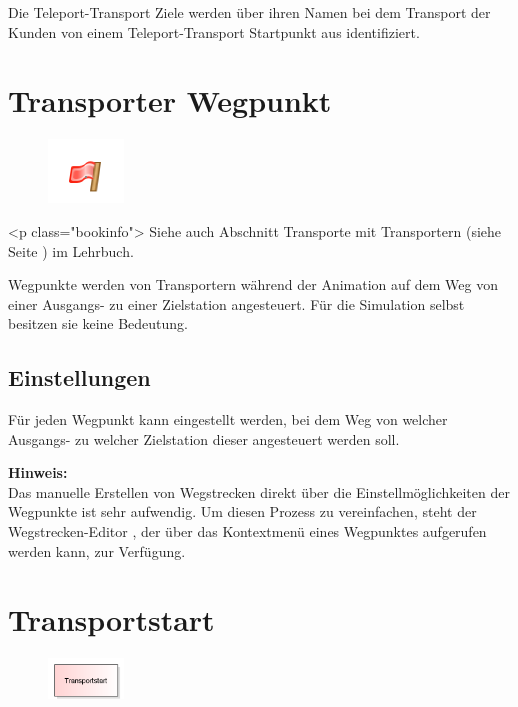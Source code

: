 Die Teleport-Transport Ziele werden über ihren Namen bei dem Transport der Kunden von
einem Teleport-Transport Startpunkt aus identifiziert.


\section{Transporter Wegpunkt}
\label{ref:ModelElementWayPoint}

\begin{figure}
\vspace{-22pt}
\includegraphics[width=2cm]{imageModelElementWayPoint.png}
\vspace{-22pt}
\end{figure}

<p class="bookinfo">
Siehe auch Abschnitt Transporte mit Transportern (siehe Seite \pageref{ref:book:8.3.2}) im Lehrbuch.

Wegpunkte werden von Transportern während der Animation auf dem Weg von einer Ausgangs-
zu einer Zielstation angesteuert. Für die Simulation selbst besitzen sie keine Bedeutung.

\subsection*{Einstellungen}

Für jeden Wegpunkt kann eingestellt werden, bei dem Weg von welcher Ausgangs- zu welcher
Zielstation dieser angesteuert werden soll.

\textbf{Hinweis:}~\\
Das manuelle Erstellen von Wegstrecken direkt über die Einstellmöglichkeiten der
Wegpunkte ist sehr aufwendig. Um diesen Prozess zu vereinfachen, steht der
Wegstrecken-Editor , der über das Kontextmenü
eines Wegpunktes aufgerufen werden kann, zur Verfügung.


\section{Transportstart}
\label{ref:ModelElementTransportSource}

\begin{figure}
\vspace{-22pt}
\includegraphics[width=2cm]{imageModelElementTransportSource.png}
\vspace{-22pt}
\end{figure}

